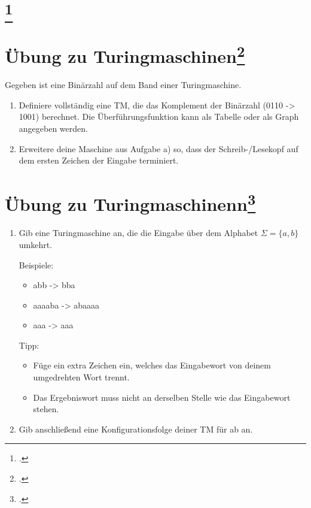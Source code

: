 \documentclass{lehramt-informatik-aufgabe}
\begin{document}
\section{
\footcite{theo:fs:3}}

\section{Übung zu Turingmaschinen\footcite[Seite 22]{theo:fs:3}}

Gegeben ist eine Binärzahl auf dem Band einer Turingmaschine.

\begin{enumerate}
\item Definiere vollständig eine TM, die das Komplement der Binärzahl
(0110 -> 1001) berechnet. Die Überführungsfunktion kann als Tabelle oder
als Graph angegeben werden.

\item Erweitere deine Maschine aus Aufgabe a) so, dass der
Schreib-/Lesekopf auf dem ersten Zeichen der Eingabe terminiert.

\end{enumerate}
\section{Übung zu Turingmaschinenn\footcite[Seite 24]{theo:fs:3}}

\begin{enumerate}
\item Gib eine Turingmaschine an, die die Eingabe über dem Alphabet
$\Sigma = \{ a, b \}$ umkehrt.

Beispiele:

\begin{itemize}
\item abb -> bba
\item aaaaba -> abaaaa
\item aaa -> aaa
\end{itemize}

Tipp:

\begin{itemize}
\item Füge ein extra Zeichen ein, welches das Eingabewort von deinem
umgedrehten Wort trennt.

\item Das Ergebniswort muss nicht an derselben Stelle wie das
Eingabewort stehen.
\end{itemize}

\item Gib anschließend eine Konfigurationsfolge deiner TM für ab an.

\end{enumerate}
\end{document}

